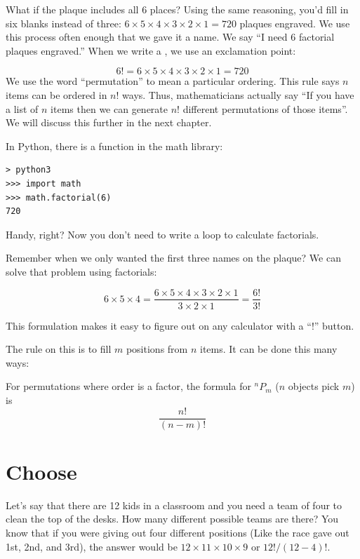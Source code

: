 What if the plaque includes all 6 places?  Using the same reasoning, you'd
fill in six blanks instead of three: $6 \times 5 \times 4 \times 3 \times 2
\times 1 = 720$ plaques engraved.  We use this process often enough that
we gave it a name.  We say ``I need 6 factorial plaques engraved.''  When
we write a , we use an exclamation point:

$$6! = 6 \times 5 \times 4 \times 3 \times 2 \times 1 = 720$$
We use the word ``permutation'' to mean a particular ordering.
This rule says $n$ items can be ordered in $n!$ ways. Thus,
mathematicians actually say ``If you have a list of $n$ items then we
can generate $n!$ different permutations of those items''. We will discuss this further in the next chapter. 

In Python, there is a  function in the math library:
\begin{verbatim}
> python3 
>>> import math
>>> math.factorial(6)
720
\end{verbatim}

Handy, right? Now you don't need to write a loop to calculate factorials.

Remember when we only wanted the first three names on the plaque? We can solve that problem using factorials:

$$6 \times 5 \times 4 = \frac{6 \times 5 \times 4 \times 3 \times 2 \times 1}{3 \times 2 \times 1} = \frac{6!}{3!}$$

This formulation makes it easy to figure out on any calculator with a ``!'' button.

The rule on this is to fill $m$ positions from $n$ items. It can be done this many ways:
\begin{mdframed}[frametitle = {Permutations}, style = important]
For permutations where order is a factor, the formula for ${}^nP_m$ ($n$ objects pick $m$) is 
$$\frac{n!}{(n-m)!}$$
\end{mdframed}

\section{Choose}

Let's say that there are 12 kids in a classroom and you need a team
of four to clean the top of the desks. How many different possible teams are
there? You know that if you were giving out four different positions
(Like the race gave out 1st, 2nd, and 3rd), the answer would be $12\times 11 \times 10 \times 9$ or $12! / (12 - 4)!$.

